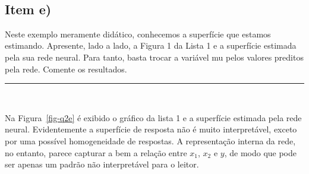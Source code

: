 \documentclass[
  a4paperpaper,
]{article}
\begin{document}
~

\subsection{Item e)}\label{item-e}

Neste exemplo meramente didático, conhecemos a superfície que estamos
estimando. Apresente, lado a lado, a Figura 1 da Lista 1 e a superfície
estimada pela sua rede neural. Para tanto, basta trocar a variável mu
pelos valores preditos pela rede. Comente os resultados.

\begin{center}\rule{0.5\linewidth}{0.5pt}\end{center}

~

Na Figura~\ref{fig-q2e} é exibido o gráfico da lista 1 e a superfície
estimada pela rede neural. Evidentemente a superfície de resposta não é
muito interpretável, exceto por uma possível homogeneidade de respostas.
A representação interna da rede, no entanto, parece capturar a bem a
relação entre \(x_1\), \(x_2\) e \(y\), de modo que pode ser apenas um
padrão não interpretável para o leitor.

~
\end{document}
